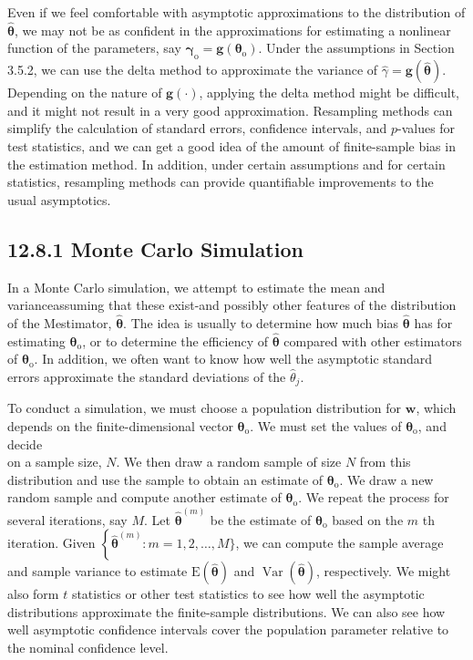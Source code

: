 \documentclass[10pt]{article}
\begin{document}
Even if we feel comfortable with asymptotic approximations to the distribution of $\hat{\boldsymbol{\theta}}$, we may not be as confident in the approximations for estimating a nonlinear function of the parameters, say $\boldsymbol{\gamma}_{\mathrm{o}}=\mathbf{g}\left(\boldsymbol{\theta}_{\mathrm{o}}\right)$. Under the assumptions in Section 3.5.2, we can use the delta method to approximate the variance of $\hat{\gamma}=\mathbf{g}(\hat{\boldsymbol{\theta}})$. Depending on the nature of $\mathbf{g}(\cdot)$, applying the delta method might be difficult, and it might not result in a very good approximation. Resampling methods can simplify the calculation of standard errors, confidence intervals, and $p$-values for test statistics, and we can get a good idea of the amount of finite-sample bias in the estimation method. In addition, under certain assumptions and for certain statistics, resampling methods can provide quantifiable improvements to the usual asymptotics.

\subsection*{12.8.1 Monte Carlo Simulation}
In a Monte Carlo simulation, we attempt to estimate the mean and varianceassuming that these exist-and possibly other features of the distribution of the Mestimator, $\hat{\boldsymbol{\theta}}$. The idea is usually to determine how much bias $\hat{\boldsymbol{\theta}}$ has for estimating $\boldsymbol{\theta}_{\mathrm{o}}$, or to determine the efficiency of $\hat{\boldsymbol{\theta}}$ compared with other estimators of $\boldsymbol{\theta}_{\mathrm{o}}$. In addition, we often want to know how well the asymptotic standard errors approximate the standard deviations of the $\hat{\theta}_{j}$.

To conduct a simulation, we must choose a population distribution for $\mathbf{w}$, which depends on the finite-dimensional vector $\boldsymbol{\theta}_{\mathrm{o}}$. We must set the values of $\boldsymbol{\theta}_{\mathrm{o}}$, and decide\\
on a sample size, $N$. We then draw a random sample of size $N$ from this distribution and use the sample to obtain an estimate of $\boldsymbol{\theta}_{\mathrm{o}}$. We draw a new random sample and compute another estimate of $\boldsymbol{\theta}_{\mathrm{o}}$. We repeat the process for several iterations, say $M$. Let $\hat{\boldsymbol{\theta}}^{(m)}$ be the estimate of $\boldsymbol{\theta}_{\mathrm{o}}$ based on the $m$ th iteration. Given $\left\{\hat{\boldsymbol{\theta}}^{(m)}: m=\right. 1,2, \ldots, M\}$, we can compute the sample average and sample variance to estimate $\mathrm{E}(\hat{\boldsymbol{\theta}})$ and $\operatorname{Var}(\hat{\boldsymbol{\theta}})$, respectively. We might also form $t$ statistics or other test statistics to see how well the asymptotic distributions approximate the finite-sample distributions. We can also see how well asymptotic confidence intervals cover the population parameter relative to the nominal confidence level.
\end{document}

